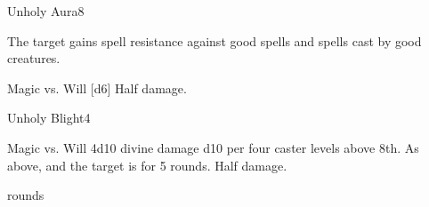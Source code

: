 \begin{spellsection}{Unholy Aura}{8}
\begin{spellheader}
\end{spellheader}
\begin{spellcontent}
    \begin{spelltargetinginfo}
    \end{spelltargetinginfo}
    \begin{spelleffects}
        \spelleffect The target gains spell resistance against good spells and spells cast by good creatures.
        \spelldur \durshort \dismissable
    \end{spelleffects}
\end{spellcontent}
\begin{spellsubcontent}
    \begin{spelltargetinginfo}
    \end{spelltargetinginfo}
    \begin{spelleffects}
        \begin{spellattack}{Magic vs. Will}
            \spellsuccess {}[d6]
            \spellfailure Half damage.
        \end{spellattack}
    \end{spelleffects}
\end{spellsubcontent}
\begin{spellfooter}
\end{spellfooter}
\end{spellsection}

\begin{spellsection}{Unholy Blight}{4}
\begin{spellheader}
    \begin{spelltargetinginfo}
    \end{spelltargetinginfo}
\end{spellheader}
\begin{spellcontent}
    \begin{spelleffects}
        \begin{spellattack}{Magic vs. Will}
            \spellsuccess 4d10 divine damage \add d10 per four caster levels above 8th.
            \spellcritical As above, and the target is \staggered for 5 rounds.
            \spellfailure Half damage.
        \end{spellattack}
         rounds
    \end{spelleffects}
\end{spellcontent}
\begin{spellfooter}
\end{spellfooter}
\end{spellsection}

